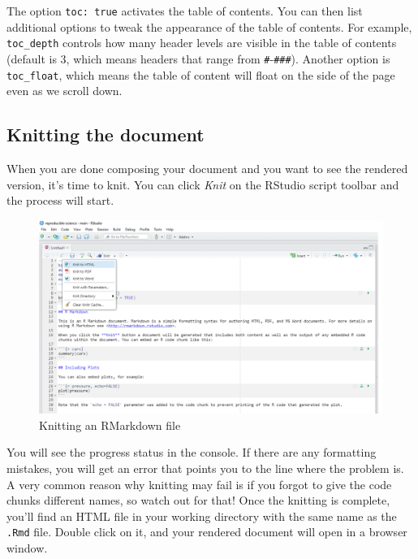 \documentclass[
]{book}
\begin{document}
The option \texttt{toc:\ true} activates the table of contents. You can then list
additional options to tweak the appearance of the table of contents. For
example, \texttt{toc\_depth} controls how many header levels are visible in the table of
contents (default is 3, which means headers that range from \texttt{\#}-\texttt{\#\#\#}). Another
option is \texttt{toc\_float}, which means the table of content will float on the side
of the page even as we scroll down.

\hypertarget{knitting-the-document}{%
\subsection{Knitting the document}\label{knitting-the-document}}

When you are done composing your document and you want to see the rendered
version, it's time to knit. You can click \emph{Knit} on the RStudio script toolbar
and the process will start.

\begin{figure}

{\centering \includegraphics[width=1\linewidth]{img/rmarkdown3} 

}

\caption{Knitting an RMarkdown file}\label{fig:rmarkdown3}
\end{figure}

You will see the progress status in the console. If
there are any formatting mistakes, you will get an error that points you to the
line where the problem is. A very common reason why knitting may fail is if you
forgot to give the code chunks different names, so watch out for that! Once the
knitting is complete, you'll find an HTML file in your working directory with
the same name as the \texttt{.Rmd} file. Double click on it, and your rendered document
will open in a browser window.
\end{document}
